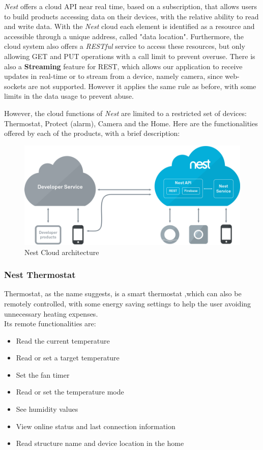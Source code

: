 \textit{Nest} offers a cloud API near real time, based on a subscription, that allows
users to build products accessing data on their devices, with the relative ability
to read and write data. With the \textit{Nest} cloud each element is identified as a resource
and accessible through a unique address, called "data location".
Furthermore, the cloud system also offers a \textit{RESTful} service to access these resources,
but only allowing GET and PUT operations with a call limit to prevent overuse. There is also
a \textbf{Streaming} feature for REST, which allows our application to receive updates
in real-time or to stream from a device, namely camera, since web-sockets are not supported.
However it applies the same rule as before, with some limits in the data usage to prevent abuse.


However, the cloud functions of \textit{Nest} are limited to a restricted set of devices:
Thermostat, Protect (alarm), Camera and the Home.
Here are the functionalities offered by each of the products, with a brief description:
\begin{figure}[h]
\caption{Nest Cloud architecture}
\label{fig:nestarch}
\centering
\includegraphics[scale=0.35]{nest-architecture.png}
\end{figure}

\subsubsection{Nest Thermostat}
Thermostat, as the name suggests, is a smart thermostat ,which can also be remotely controlled,
with some energy saving settings to help the user avoiding unnecessary heating expenses.   \\
Its remote functionalities are:

\begin{itemize}
    \item Read the current temperature
    \item Read or set a target temperature
    \item Set the fan timer
    \item Read or set the temperature mode
    \item See humidity values
    \item View online status and last connection information
    \item Read structure name and device location in the home
\end{itemize}

